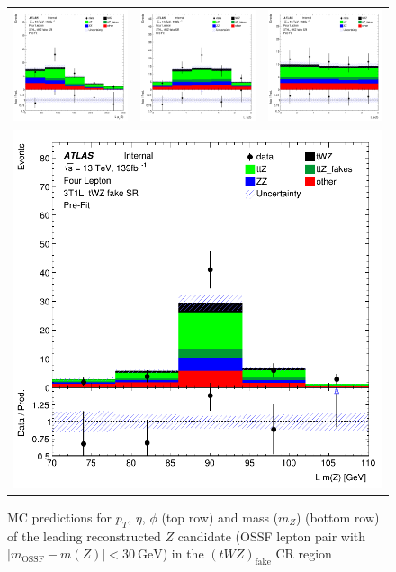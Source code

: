 \begin{figure}[htbp]
\centering
  \begin{tabular}{ccc}

    \includegraphics[width=.2\textwidth]{figures/PreFitPlots/lep4_tWZ_3T1L_0_Z_pt}&
    \includegraphics[width=.2\textwidth]{figures/PreFitPlots/lep4_tWZ_3T1L_0_Z_eta} &
    \includegraphics[width=.2\textwidth]{figures/PreFitPlots/lep4_tWZ_3T1L_0_Z_phi} \\
    \multicolumn{3}{c}{\includegraphics[width=.2\textwidth]{figures/PreFitPlots/lep4_tWZ_3T1L_0_Z_mass}}

  \end{tabular}
    \caption{MC predictions for $p_{T}$, $\eta$, $\phi$ (top row) and mass ($m_Z$) (bottom row) of the leading reconstructed $Z$ candidate (OSSF lepton pair with $|m_{\text{OSSF}} - m(Z)| <  \SI{30}{\GeV}$) in the $(tWZ)_{\text{fake}}$ CR region }
  \label{fig:4lep-3T1L-CR-ZCands-Plots}
\end{figure}
\clearpage



